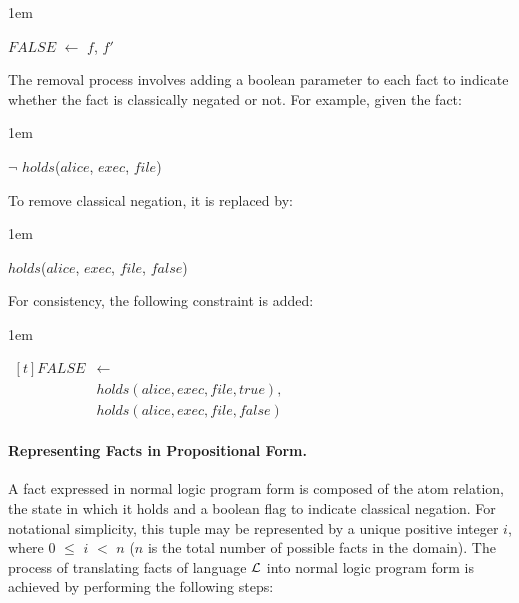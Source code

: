 \documentclass[global,twocolumn,final]{svjour}
\newenvironment{vquote}
  {\begin{list}{}{\leftmargin 1em}\item[]}
  {\end{list}}
\begin{document}
          \begin{vquote}
            $FALSE$ $\leftarrow$ $f$, $f'$
          \end{vquote}

          The removal process involves adding a boolean parameter to each fact
          to indicate whether the fact is classically negated or not. For
          example, given the fact:

          \begin{vquote}
            $\lnot$ $holds$($alice$, $exec$, $file$)
          \end{vquote}

          To remove classical negation, it is replaced by:

          \begin{vquote}
            $holds$($alice$, $exec$, $file$, $false$)
          \end{vquote}

          For consistency, the following constraint is added:

          \begin{vquote}
            \begin{math}
              \begin{aligned}[t]
                FALSE & \leftarrow \\
                & holds(alice, exec, file, true), \\
                & holds(alice, exec, file, false)
              \end{aligned}
            \end{math}
          \end{vquote}

        \paragraph{Representing Facts in Propositional Form.}

          A fact expressed in normal logic program form is composed of the
          atom relation, the state in which it holds and a boolean flag to
          indicate classical negation. For notational simplicity, this tuple
          may be represented by a unique positive integer $i$, where $0$ $\leq$
          $i$ $<$ $n$ ($n$ is the total number of possible facts in the
          domain). The process of translating facts of language ${\cal L}$
          into normal logic program form is achieved by performing the
          following steps:
\end{document}
